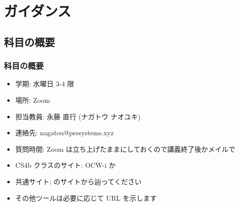 \section{ガイダンス}
%
%
\subsection{科目の概要}
\begin{frame}
\frametitle{科目の概要}
  \begin{itemize}
\item 学期: 水曜日 3-4 限
\item 場所: Zoom
\item 担当教員: 永藤 直行 (ナガトウ ナオユキ)
\item 連絡先: nagatou@presystems.xyz
\item 質問時間: Zoom は立ち上げたままにしておくので講義終了後かメイルで
\item CS4b クラスのサイト: OCW-i か \href{https://sites.google.com/a/presystems.xyz/sample/home/elementary-computer-science}{} 
\item 共通サイト: \href{http://www.edu.gsic.titech.ac.jp/}{}のサイトから辿ってください
\item その他ツールは必要に応じて URL を示します
  \end{itemize}
\end{frame}
%
%
%
%
